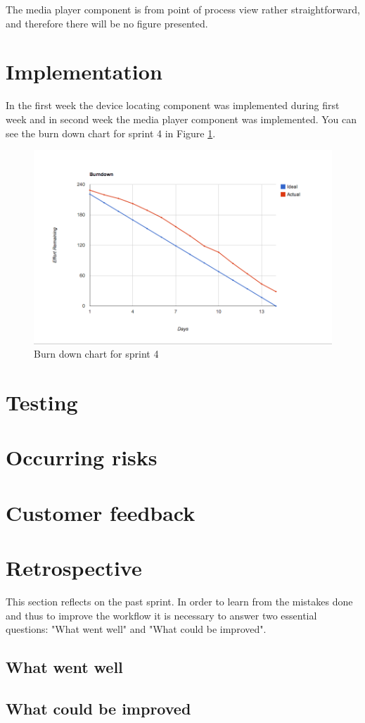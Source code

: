 The media player component is from point of process view rather straightforward, and therefore there will be no figure presented.

\section{Implementation}
In the first week the device locating component was implemented during first week and in second week the media player component was implemented.
You can see the burn down chart for sprint 4 in Figure \ref{fig:Burn4 }.

\begin{figure}[h]
	\centering
		\includegraphics[width=18cm]{sprint4/BurndownSprint4.png}
	\caption{Burn down chart for sprint 4}
	\label{fig:Burn4 }
\end{figure}
\section{Testing}
\section{Occurring risks}
\section{Customer feedback}
\section{Retrospective}
This section reflects on the past sprint. In order to learn from the mistakes done and thus to improve the workflow it is necessary to answer two essential questions: "What went well" and "What could be improved".

\subsection{What went well}
\subsection{What could be improved}
